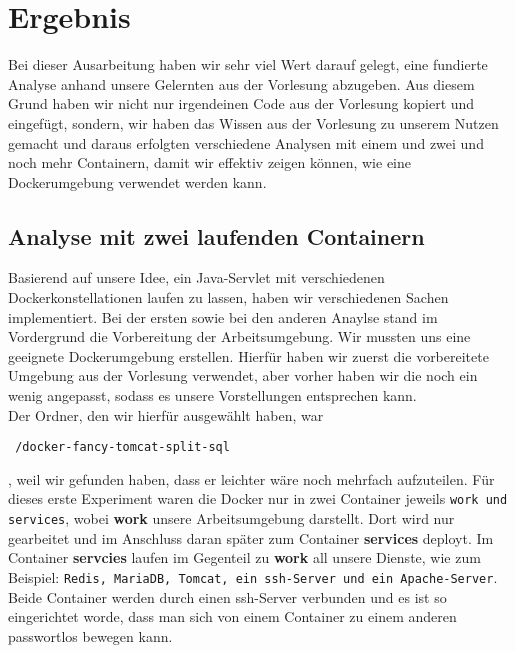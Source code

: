 \section{Ergebnis}\label{Ergebnis}


Bei dieser Ausarbeitung haben wir sehr viel Wert darauf gelegt, eine fundierte Analyse anhand unsere Gelernten aus der Vorlesung abzugeben. Aus diesem Grund haben wir nicht nur irgendeinen Code aus der Vorlesung kopiert und eingefügt, sondern, wir haben das Wissen aus der Vorlesung zu unserem Nutzen gemacht und daraus erfolgten verschiedene Analysen mit einem und zwei und noch mehr Containern, damit wir effektiv zeigen können, wie eine Dockerumgebung verwendet werden kann.

\subsection{Analyse mit zwei laufenden Containern}


Basierend auf unsere Idee, ein Java-Servlet mit verschiedenen Dockerkonstellationen laufen zu lassen, haben wir verschiedenen Sachen implementiert. Bei der ersten sowie bei den anderen Anaylse stand im Vordergrund die Vorbereitung der Arbeitsumgebung. Wir mussten uns eine geeignete Dockerumgebung erstellen. Hierfür haben wir zuerst die vorbereitete Umgebung aus der Vorlesung verwendet, aber vorher haben wir die noch ein wenig angepasst, sodass es unsere Vorstellungen entsprechen kann.\\

Der Ordner, den wir hierfür  ausgewählt haben, war \begin{verbatim} /docker-fancy-tomcat-split-sql \end{verbatim}, weil wir gefunden haben, dass er leichter wäre noch mehrfach aufzuteilen. Für dieses erste Experiment waren die Docker nur in  zwei Container jeweils \texttt{work und services}, wobei \textbf{work} unsere Arbeitsumgebung darstellt. Dort wird nur gearbeitet und im Anschluss daran später zum Container \textbf{services} deployt. Im Container \textbf{servcies} laufen im Gegenteil zu \textbf{work} all unsere Dienste, wie zum Beispiel: \texttt{Redis, MariaDB, Tomcat, ein ssh-Server und ein Apache-Server}. Beide Container werden durch einen ssh-Server verbunden und es ist so eingerichtet worde, dass man sich von einem Container zu einem anderen passwortlos bewegen kann.\\

